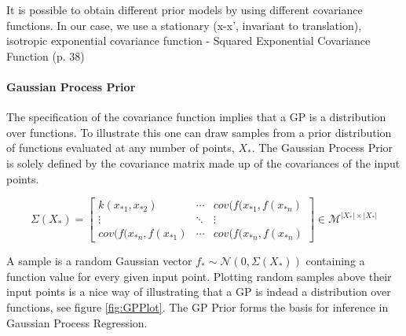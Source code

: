 It is possible to obtain different prior models by using different covariance functions. In our case, we use a stationary (x-x’, invariant to translation), isotropic exponential covariance function - Squared Exponential Covariance Function (p. 38)

\paragraph{Gaussian Process Prior}
The specification of the covariance function implies that a GP is a distribution over functions. To illustrate this one can draw samples from a prior distribution of functions evaluated at any number of points, $X_{*}$. The Gaussian Process Prior is solely defined by the covariance matrix made up of the covariances of the input points.

\begin{equation}
    \Sigma(X_{*})=\begin{bmatrix}
k(x_{*1},x_{*2}) & \cdots & cov(f(x_{*1},f(x_{*n}) \\
\vdots & \ddots & \vdots \\
cov(f(x_{*n},f(x_{*1}) & \cdots & cov(f(x_{*n},f(x_{*n}) 
\end{bmatrix} \in \mathcal{M}^{\left|X_{*}\right| \times \left|X_{*}\right|} 
\end{equation}

A sample is a random Gaussian vector $f_{*} \sim \mathcal{N}(0, \Sigma(X_{*}))$ containing a function value for every given input point. Plotting random
samples above their input points is a nice way of illustrating that a GP is indead a distribution over functions, see figure \ref{fig:GPPlot}. The GP Prior forms the basis for inference in Gaussian Process Regression.

